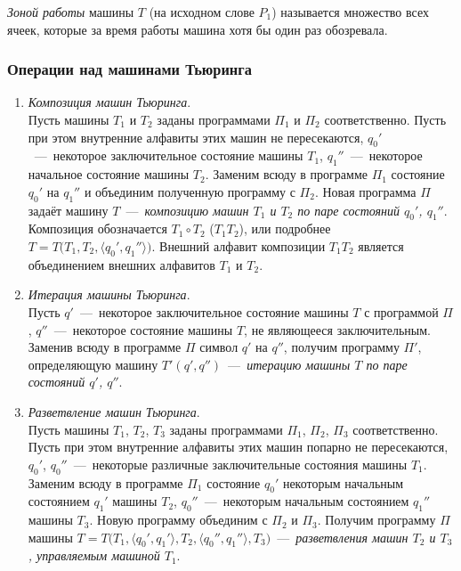 \textit{Зоной работы} машины $T$ (на исходном слове $P_1$) называется множество всех ячеек, которые за время работы машина хотя бы один раз обозревала.

\subsubsection{Операции над машинами Тьюринга}
\begin{enumerate}
    \item \textit{Композиция машин Тьюринга}. \\
    Пусть машины $T_1$ и $T_2$ заданы программами $\Pi_1$ и $\Pi_2$ соответственно. Пусть при этом внутренние алфавиты этих машин не пересекаются, $q_0'$~---~некоторое заключительное состояние машины $T_1$, $q_1''$~---~некоторое начальное состояние машины $T_2$. Заменим всюду в программе $\Pi_1$ состояние $q_0'$ на $q_1''$ и объединим полученную программу с $\Pi_2$. Новая программа $\Pi$ задаёт машину $T$~---~\textit{композицию машин $T_1$ и $T_2$ по паре состояний $q_0'$, $q_1''$}. Композиция обозначается $T_1\circ T_2$ ($T_1T_2$), или подробнее $T = T\big(T_1, T_2, \langle q_0', q_1''\rangle\big)$. Внешний алфавит композиции $T_1T_2$ является объединением внешних алфавитов $T_1$ и $T_2$.

    \item \textit{Итерация машины Тьюринга}. \\
    Пусть $q'$~---~некоторое заключительное состояние машины $T$ с программой $\Pi$, $q''$~---~некоторое состояние машины $T$, не являющееся заключительным. Заменив всюду в программе $\Pi$ символ $q'$ на $q''$, получим программу $\Pi'$, определяющую машину $T'(q', q'')$~---~\textit{итерацию машины $T$ по паре состояний $q'$, $q''$}.

    \item \textit{Разветвление машин Тьюринга}. \\
    Пусть машины $T_1$, $T_2$, $T_3$ заданы программами $\Pi_1$, $\Pi_2$, $\Pi_3$ соответственно. Пусть при этом внутренние алфавиты этих машин попарно не пересекаются, $q_0'$, $q_0''$~---~некоторые различные заключительные состояния машины $T_1$. Заменим всюду в программе $\Pi_1$ состояние $q_0'$ некоторым начальным состоянием $q_1'$ машины $T_2$, $q_0''$~---~некоторым начальным состоянием $q_1''$ машины $T_3$. Новую программу объединим с $\Pi_2$ и $\Pi_3$. Получим программу $\Pi$ машины $T = T\big(T_1, \langle q_0', q_1'\rangle, T_2, \langle q_0'', q_1''\rangle, T_3\big)$~---~\textit{разветвления машин $T_2$ и $T_3$, управляемым машиной $T_1$}.
\end{enumerate}

